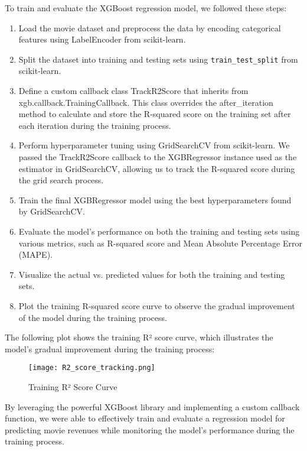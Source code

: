 \documentclass[conference]{IEEEtran}
\begin{document}
        To train and evaluate the XGBoost regression model, we followed these steps:
        \begin{enumerate}
        \item Load the movie dataset and preprocess the data by encoding categorical features using LabelEncoder from scikit-learn.
        \item Split the dataset into training and testing sets using \texttt{train\_test\_split} from scikit-learn.
        \item Define a custom callback class TrackR2Score that inherits from xgb.callback.TrainingCallback. This class overrides the after\_iteration method to calculate and store the R-squared score on the training set after each iteration during the training process.
        \item Perform hyperparameter tuning using GridSearchCV from scikit-learn. We passed the TrackR2Score callback to the XGBRegressor instance used as the estimator in GridSearchCV, allowing us to track the R-squared score during the grid search process.
        \item Train the final XGBRegressor model using the best hyperparameters found by GridSearchCV.
        \item Evaluate the model's performance on both the training and testing sets using various metrics, such as R-squared score and Mean Absolute Percentage Error (MAPE).
        \item Visualize the actual vs. predicted values for both the training and testing sets.
        \item Plot the training R-squared score curve to observe the gradual improvement of the model during the training process.
        \end{enumerate}
    The following plot shows the training R² score curve, which illustrates the model's gradual improvement during the training process:
    \begin{figure}[h]
        \centering
        \texttt{[image: R2\_score\_tracking.png]}
        \caption{Training R² Score Curve}
        \label{fig:xg_boost_track}
    \end{figure}
    By leveraging the powerful XGBoost library and implementing a custom callback function, we were able to effectively train and evaluate a regression model for predicting movie revenues while monitoring the model's performance during the training process.
\end{document}
